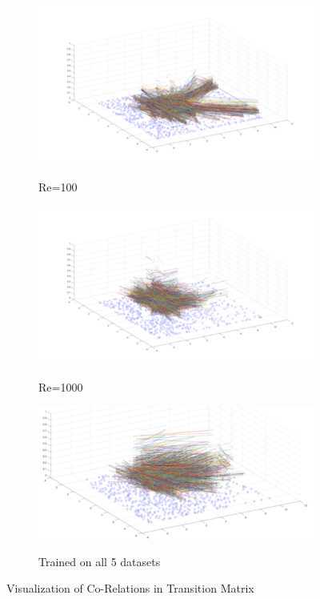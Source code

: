 \documentclass[letterpaper,12pt,peerreviewca,draftcls]{IEEEtran}
\begin{document}
\begin{figure}[h]
	\centering
	\begin{subfigure}[t]{0.7\textwidth}
		\includegraphics[width=\linewidth]{"Figure S11a.pdf"}
		\label{fig:haystack100}
		\caption{Re=100}
	\end{subfigure}
	\begin{subfigure}[t]{0.7\textwidth}
		\includegraphics[width=\linewidth]{"Figure S11b.pdf"}
		\label{fig:haystack1000}
		\caption{Re=1000}
	\end{subfigure}
	\begin{subfigure}[t]{0.6\textwidth}
		\includegraphics[width=\linewidth]{"Figure S11c.pdf"}
		\label{fig:haystackall}	
		\caption{Trained on all 5 datasets}
	\end{subfigure}
	\caption{Visualization of Co-Relations in Transition Matrix}
\end{figure}
\end{document}
